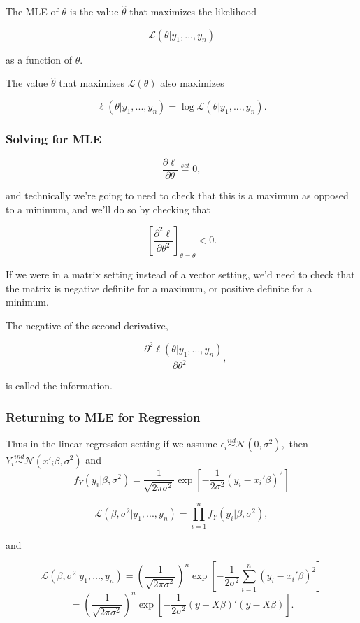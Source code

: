 \documentclass[
  letterpaper,
  DIV=11,
  numbers=noendperiod]{scrreport}
\begin{document}
The {MLE} of \(\theta\) is the value \(\hat \theta\) that maximizes the
likelihood

\[\mathcal L(\theta | y_1, ..., y_n)\]

as a function of \(\theta\).

The value \(\hat \theta\) that maximizes \(\mathcal L(\theta)\) also
maximizes

\[\ell(\theta | y_1, ..., y_n) = \log \mathcal L(\theta | y_1, ..., y_n).\]

\hypertarget{solving-for-mle}{%
\subsubsection{Solving for MLE}\label{solving-for-mle}}

\[ \frac{\partial \ell}{\partial \theta} \stackrel{set}{=} 0,\]

and technically we're going to need to check that this is a maximum as
opposed to a minimum, and we'll do so by checking that

\[\left[ \frac{\partial^2 \ell}{\partial \theta^2} \right]_{\theta = \hat \theta} < 0.\]

If we were in a matrix setting instead of a vector setting, we'd need to
check that the matrix is negative definite for a maximum, or positive
definite for a minimum.

The negative of the second derivative,

\[\frac{-\partial^2 \ell(\theta | y_1, ..., y_n)}{\partial \theta^2},\]

is called the {information}.

\hypertarget{returning-to-mle-for-regression}{%
\subsubsection{Returning to MLE for
Regression}\label{returning-to-mle-for-regression}}

Thus in the linear regression setting if we assume
\(\epsilon_i \stackrel{iid}{\sim} \mathcal N(0, \sigma^2),\) then
\(Y_i \stackrel{ind}{\sim} \mathcal N(x'_i\beta, \sigma^2)\) and
\[f_Y(y_i|\beta, \sigma^2) = \frac{1}{\sqrt{2\pi\sigma^2}} \exp \left[ -\frac{1}{2\sigma^2} (y_i - x_i'\beta)^2\right]\]

\[\mathcal L(\beta, \sigma^2 | y_1, ..., y_n) = \prod_{i=1}^n f_Y(y_i|\beta, \sigma^2),\]

and

\[\mathcal L(\beta, \sigma^2|y_1, ..., y_n) = \left( \frac{1}{\sqrt{2\pi\sigma^2}}\right)^n
\exp \left[ - \frac{1}{2\sigma^2} \sum_{i=1}^n (y_i - x_i'\beta)^2 \right]\]
\[= \left( \frac{1}{\sqrt{2\pi\sigma^2}}\right)^n
\exp \left[ - \frac{1}{2\sigma^2} (y - X\beta)'(y-X\beta) \right].\]
\end{document}
